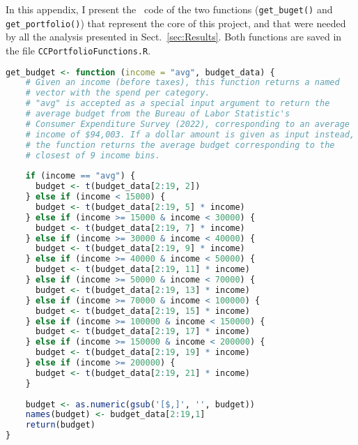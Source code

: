 In this appendix, I present the \sR\ code of the two functions (\texttt{get\_buget()} and \texttt{get\_portfolio()}) that represent the core of this project, and that were needed by all the analysis presented in Sect.~\ref{sec:Results}.
Both functions are saved in the file \texttt{CCPortfolioFunctions.R}.

\singlespacing
\begin{lstlisting}[language=R]
get_budget <- function (income = "avg", budget_data) {
    # Given an income (before taxes), this function returns a named
    # vector with the spend per category.
    # "avg" is accepted as a special input argument to return the 
    # average budget from the Bureau of Labor Statistic's 
    # Consumer Expenditure Survey (2022), corresponding to an average 
    # income of $94,003. If a dollar amount is given as input instead, 
    # the function returns the average budget corresponding to the 
    # closest of 9 income bins.
        
    if (income == "avg") { 
      budget <- t(budget_data[2:19, 2])
    } else if (income < 15000) { 
      budget <- t(budget_data[2:19, 5] * income)
    } else if (income >= 15000 & income < 30000) { 
      budget <- t(budget_data[2:19, 7] * income)
    } else if (income >= 30000 & income < 40000) { 
      budget <- t(budget_data[2:19, 9] * income)
    } else if (income >= 40000 & income < 50000) { 
      budget <- t(budget_data[2:19, 11] * income)
    } else if (income >= 50000 & income < 70000) { 
      budget <- t(budget_data[2:19, 13] * income)
    } else if (income >= 70000 & income < 100000) { 
      budget <- t(budget_data[2:19, 15] * income)
    } else if (income >= 100000 & income < 150000) { 
      budget <- t(budget_data[2:19, 17] * income)
    } else if (income >= 150000 & income < 200000) { 
      budget <- t(budget_data[2:19, 19] * income)
    } else if (income >= 200000) { 
      budget <- t(budget_data[2:19, 21] * income)
    }
        
    budget <- as.numeric(gsub('[$,]', '', budget))
    names(budget) <- budget_data[2:19,1]
    return(budget)
}  
\end{lstlisting}

\newpage

